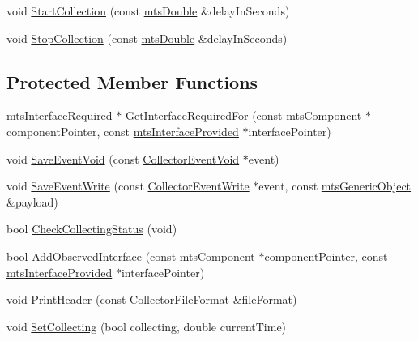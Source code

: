 {\bf }\par
\begin{DoxyCompactItemize}
\item 
void \hyperlink{classmts_collector_event_aceb830acb6f06d952ca3c9f19e5d3dc3}{Start\+Collection} (const \hyperlink{mts_generic_object_proxy_8h_a31e76b0190a8d3f9838626cd7b47bd75}{mts\+Double} \&delay\+In\+Seconds)
\item 
void \hyperlink{classmts_collector_event_afd6e55e376f1d008c6ba66ffd4353d18}{Stop\+Collection} (const \hyperlink{mts_generic_object_proxy_8h_a31e76b0190a8d3f9838626cd7b47bd75}{mts\+Double} \&delay\+In\+Seconds)
\end{DoxyCompactItemize}

\subsection*{Protected Member Functions}
\begin{DoxyCompactItemize}
\item 
\hyperlink{classmts_interface_required}{mts\+Interface\+Required} $\ast$ \hyperlink{classmts_collector_event_ae01c4c7fb83dbc8b55e9405e0964dae5}{Get\+Interface\+Required\+For} (const \hyperlink{classmts_component}{mts\+Component} $\ast$component\+Pointer, const \hyperlink{classmts_interface_provided}{mts\+Interface\+Provided} $\ast$interface\+Pointer)
\item 
void \hyperlink{classmts_collector_event_ad17e85726815169d5f3b7d3555c19d46}{Save\+Event\+Void} (const \hyperlink{classmts_collector_event_1_1_collector_event_void}{Collector\+Event\+Void} $\ast$event)
\item 
void \hyperlink{classmts_collector_event_adfff10f735b0b108a84fd1642420cc08}{Save\+Event\+Write} (const \hyperlink{classmts_collector_event_1_1_collector_event_write}{Collector\+Event\+Write} $\ast$event, const \hyperlink{classmts_generic_object}{mts\+Generic\+Object} \&payload)
\item 
bool \hyperlink{classmts_collector_event_afb73c656252aa7d8a9499b1ab69169c4}{Check\+Collecting\+Status} (void)
\item 
bool \hyperlink{classmts_collector_event_a253485e1bc58063b6f518ece60f2e82b}{Add\+Observed\+Interface} (const \hyperlink{classmts_component}{mts\+Component} $\ast$component\+Pointer, const \hyperlink{classmts_interface_provided}{mts\+Interface\+Provided} $\ast$interface\+Pointer)
\item 
void \hyperlink{classmts_collector_event_a74b00124de02baf70793abe467374162}{Print\+Header} (const \hyperlink{group__cisst_multi_task_gaa228bed8144053d0bfa316f9ac9d0901}{Collector\+File\+Format} \&file\+Format)
\item 
void \hyperlink{classmts_collector_event_ad38b92d73fb2c2829037e9e89b6b7795}{Set\+Collecting} (bool collecting, double current\+Time)
\end{DoxyCompactItemize}
